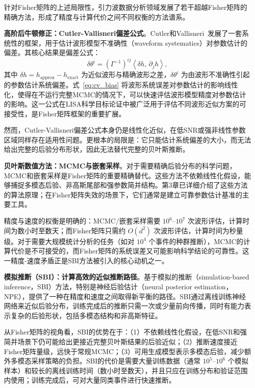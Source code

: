 针对Fisher矩阵的上述局限性，引力波数据分析领域发展了若干超越Fisher矩阵的精确方法，形成了精度与计算代价之间不同权衡的方法谱系。

\textbf{高阶后牛顿修正：Cutler-Vallisneri偏差公式}。Cutler和Vallisneri~\cite{Cutler2007Vallisneri}发展了一套系统性的框架，用于估计波形模型不准确性（waveform systematics）对参数估计的偏差。其核心结果是偏差公式：
\begin{equation}
  \delta\theta^i = \left(\Gamma^{-1}\right)^{ij} \left\langle \delta h,\, \partial_j h \right\rangle,
  \label{eq:cv_bias}
\end{equation}
其中 $\delta h = h_\mathrm{approx} - h_\mathrm{exact}$ 为近似波形与精确波形之差，$\delta\theta^i$ 为由波形不准确性引起的参数估计系统偏差。式~\eqref{eq:cv_bias} 将波形系统误差对参数估计的影响线性化，使得在不运行完整MCMC的情况下，可以快速评估波形模型精度对参数估计的影响。这一公式在LISA科学目标论证中被广泛用于评估不同波形近似方案的可接受性，是Fisher矩阵框架的重要扩展。

然而，Cutler-Vallisneri偏差公式本身仍是线性化近似，在低SNR或强非线性参数区域同样存在适用性问题。更根本的局限是：它只能估计系统偏差的大小，而无法给出完整的后验分布形状，因此无法替代完整的贝叶斯推断。

\textbf{贝叶斯数值方法：MCMC与嵌套采样}。对于需要精确后验分布的科学问题，MCMC和嵌套采样是Fisher矩阵的重要精确替代。这些方法不依赖线性化假设，能够捕捉多模态后验、非高斯尾部和强参数简并结构。第3章已详细介绍了这些方法的算法原理；在Fisher矩阵失效的场景下，它们通常是建立可靠参数估计基准的主要工具。

精度与速度的权衡是明确的：MCMC/嵌套采样需要 $10^6$--$10^7$ 次波形评估，计算时间为数小时至数天；而Fisher矩阵只需约 $O(d^2)$ 次波形评估，计算时间为秒量级。对于需要大规模统计分析的任务（如对 $10^4$ 个事件的种群推断），MCMC的计算代价是不可接受的，而Fisher矩阵的系统误差又可能影响科学结论的可靠性。这一精度-速度矛盾正是SBI方法被引入的核心动机之一。

\textbf{模拟推断（SBI）：计算高效的近似推断路径}。基于模拟的推断（simulation-based inference，SBI）方法，特别是神经后验估计（neural posterior estimation，NPE），提供了一种在精度和速度之间取得新平衡的路径。SBI通过离线训练神经网络来近似后验分布，训练完成后的推断只需一次或少量前向传播，同时有能力表示复杂的后验形状，包括多模态结构和非高斯特征。

从Fisher矩阵的视角看，SBI的优势在于：（1）不依赖线性化假设，在低SNR和强简并场景下仍可能给出更接近完整贝叶斯结果的后验近似；（2）推断速度接近Fisher矩阵量级，远快于常规MCMC；（3）可用生成模型表示多模态后验，减少额外多模态采样策略的负担。SBI的代价是需要大量训练数据（通常 $10^5$--$10^6$ 个模拟样本）和较长的离线训练时间（数小时至数天），并且只应在训练分布和验证范围内使用；训练完成后，可对大量同类事件进行快速推断。

